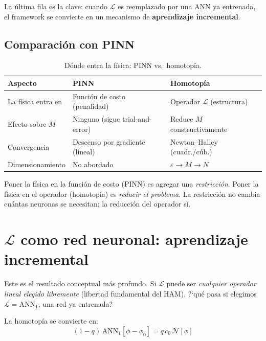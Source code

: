 \documentclass[11pt,a4paper]{article}
\begin{document}
La \'ultima fila es la clave: cuando $\mathcal{L}$ es reemplazado por una ANN ya entrenada, el framework se convierte en un mecanismo de \textbf{aprendizaje incremental}.

\subsection{Comparaci\'on con PINN}

\begin{table}[H]
\centering
\caption{D\'onde entra la f\'isica: PINN vs.\ homotop\'ia.}
\begin{tabular}{L{3.5cm} L{5cm} L{5cm}}
\toprule
\textbf{Aspecto} & \textbf{PINN} & \textbf{Homotop\'ia} \\
\midrule
La f\'isica entra en & Funci\'on de costo (penalidad) & Operador $\mathcal{L}$ (estructura) \\
Efecto sobre $M$ & Ninguno (sigue trial-and-error) & Reduce $M$ constructivamente \\
Convergencia & Descenso por gradiente (lineal) & Newton--Halley (cuadr./c\'ub.) \\
Dimensionamiento & No abordado & $\varepsilon \to M \to N$ \\
\bottomrule
\end{tabular}
\end{table}

\begin{resultado}
Poner la f\'isica en la funci\'on de costo (PINN) es agregar una \emph{restricci\'on}. Poner la f\'isica en el operador (homotop\'ia) es \emph{reducir el problema}. La restricci\'on no cambia cu\'antas neuronas se necesitan; la reducci\'on del operador s\'i.
\end{resultado}


\section{$\mathcal{L}$ como red neuronal: aprendizaje incremental}
\label{sec:incremental}

Este es el resultado conceptual m\'as profundo. Si $\mathcal{L}$ puede ser \emph{cualquier operador lineal elegido libremente} (libertad fundamental del HAM), ?`qu\'e pasa si elegimos $\mathcal{L} = \text{ANN}_1$, una red ya entrenada?

La homotop\'ia se convierte en:
\begin{equation}
(1-q)\,\text{ANN}_1[\phi - \phi_0] = q\,c_0\,\mathcal{N}[\phi]
\end{equation}
\end{document}

